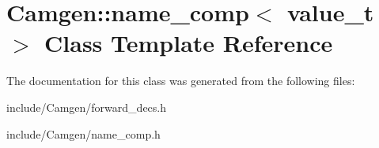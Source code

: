 \hypertarget{a00377}{\section{Camgen\-:\-:name\-\_\-comp$<$ value\-\_\-t $>$ Class Template Reference}
\label{a00377}
}


The documentation for this class was generated from the following files\-:\begin{DoxyCompactItemize}
\item 
include/\-Camgen/forward\-\_\-decs.\-h\item 
include/\-Camgen/name\-\_\-comp.\-h\end{DoxyCompactItemize}
